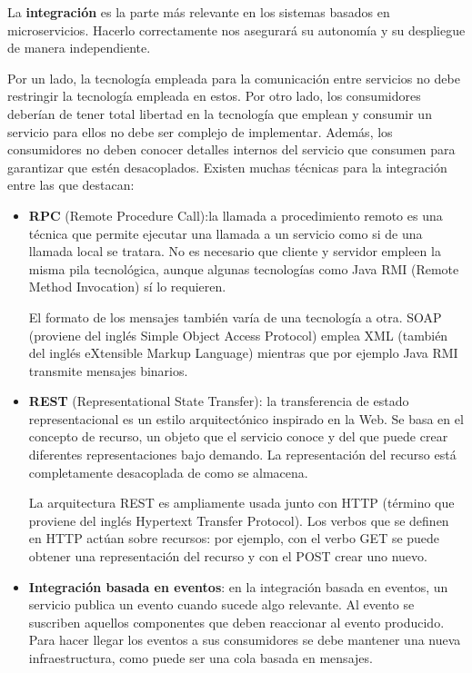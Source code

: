 \documentclass[11pt,spanish,listoffigures,listoftables]{tfgetsinf}
\begin{document}
La \textbf{integración} es la parte más relevante en los sistemas basados en microservicios. Hacerlo correctamente nos asegurará su autonomía y su despliegue de manera independiente.

Por un lado, la tecnología empleada para la comunicación entre servicios no debe restringir la tecnología empleada en estos. Por otro lado, los consumidores deberían de tener total libertad en la tecnología que emplean y consumir un servicio para ellos no debe ser complejo de implementar. Además, los consumidores no deben conocer detalles internos del servicio que consumen para garantizar que estén desacoplados. \cite{Newman2015a} Existen muchas técnicas para la integración entre las que destacan: 

\begin{itemize}

\item \textbf{RPC} (Remote Procedure Call):la llamada a procedimiento remoto es una técnica que permite ejecutar una llamada a un servicio como si de una llamada local se tratara. No es necesario que cliente y servidor empleen la misma pila tecnológica, aunque algunas tecnologías como Java RMI (Remote Method Invocation) sí lo requieren. 

El formato de los mensajes también varía de una tecnología a otra. SOAP (proviene del inglés Simple Object Access Protocol) emplea XML (también del inglés eXtensible Markup Language) mientras que por ejemplo Java RMI transmite mensajes binarios.

\item \textbf{REST} (Representational State Transfer): la transferencia de estado representacional es un estilo arquitectónico inspirado en la Web. Se basa en el concepto de recurso, un objeto que el servicio conoce y del que puede crear diferentes representaciones bajo demando. La representación del recurso está completamente desacoplada de como se almacena.

La arquitectura REST es ampliamente usada junto con HTTP (término que proviene del inglés Hypertext Transfer Protocol). Los verbos que se definen en HTTP actúan sobre recursos: por ejemplo, con el verbo GET se puede obtener una representación del recurso y con el POST crear uno nuevo.

\item \textbf{Integración basada en eventos}: en la integración basada en eventos, un servicio publica un evento cuando sucede algo relevante. Al evento se suscriben aquellos componentes que deben reaccionar al evento producido. Para hacer llegar los eventos a sus consumidores se debe mantener una nueva infraestructura, como puede ser una cola basada en mensajes.


\end{itemize}
\end{document}

